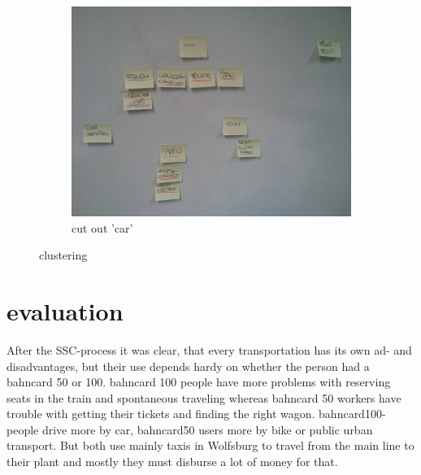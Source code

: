 \begin{figure}[!h]
\begin{subfigure}[b]{0.3\textwidth}
		\includegraphics[width=\textwidth]{images/mindmap3.jpg}
		\caption{ cut out 'car'}
		\label{fig:mindmap3}
	\end{subfigure}
	\caption{clustering}
	\label{fig:clustering}
\end{figure}

\section{evaluation}

After the SSC-process it was clear, that every transportation has its own ad- and disadvantages, but their use depends hardy on
whether the person had a bahncard 50 or 100. bahncard 100 people have more problems with reserving seats in the train and
spontaneous traveling whereas bahncard 50 workers have trouble with getting their tickets and finding the right wagon.
bahncard100-people drive more by car, bahncard50 users more by bike or public urban transport.
But both use mainly taxis in Wolfsburg to travel from the main line to their plant and mostly they must disburse a lot of money
for that. 
